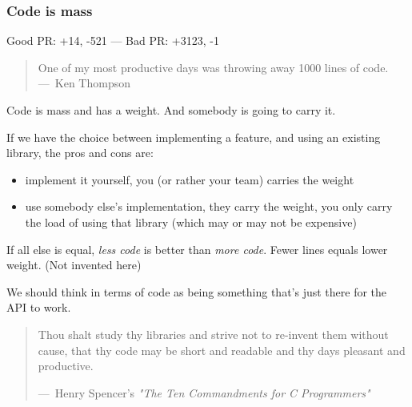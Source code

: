 \documentclass{beamer}
\begin{document}
\begin{frame}
  \frametitle{ Code is mass}

  Good PR: +14, -521 --- Bad PR: +3123, -1

  \begin{quote}
    One of my most productive days was throwing away 1000 lines of code.
    ---~Ken Thompson
  \end{quote}

  Code is mass and has a weight.  And somebody is going to carry it.

  If we have the choice between implementing a feature, and using an existing
  library, the pros and cons are:

  \begin{itemize}
  \item implement it yourself, you (or rather your team) carries the weight
  \item use somebody else's implementation, they carry the weight, you only
    carry the load of using that library (which may or may not be expensive)
  \end{itemize}

  If all else is equal, \emph{less code} is better than \emph{more code}.  Fewer
  lines equals lower weight.  (Not invented here)


  We should think in terms of code as being something that's just there for the
  API to work.

  \begin{quote}
    Thou shalt study thy libraries and strive not to re-invent them without
    cause, that thy code may be short and readable and thy days pleasant and
    productive.

    ---~Henry Spencer's \emph{"The Ten Commandments for C Programmers"}
  \end{quote}

\end{frame}
\end{document}
